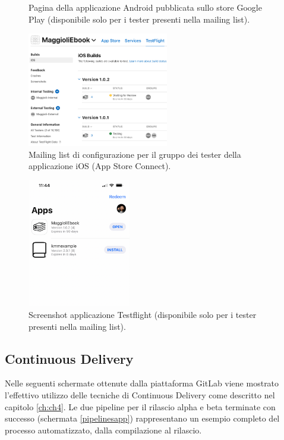 \begin{multicols}{2}
\begin{figure}[H]
    \caption{Pagina della applicazione Android pubblicata sullo store Google Play (disponibile solo per i tester presenti nella mailing list).}
    \label{playstoreapp}
\end{figure}
\end{multicols}

\newpage
\begin{multicols}{2}
\begin{figure}[H]
\centering
    \includegraphics[width=0.55\textwidth]{img/Screenshot 2022-10-05 at 11.34.06.png}
    \caption{Mailing list di configurazione per il gruppo dei tester della applicazione iOS (App Store Connect).}
    \label{appstoreconnect}
\end{figure}
\begin{figure}[H]
\centering
    \includegraphics[width=0.4\textwidth]{img/Screenshot 2022-10-10 at 09.29.20.png}
    \caption{Screenshot applicazione Testflight (disponibile solo per i tester presenti nella mailing list).}
    \label{testflight}
\end{figure}
\end{multicols}

\subsection{Continuous Delivery}
Nelle seguenti schermate ottenute dalla piattaforma GitLab viene mostrato l'effettivo utilizzo delle tecniche di Continuous Delivery come descritto nel capitolo \ref{ch:ch4}. Le due pipeline per il rilascio alpha e beta terminate con successo (schermata \ref{pipelinesapp}) rappresentano un esempio completo del processo automatizzato, dalla compilazione al rilascio.


